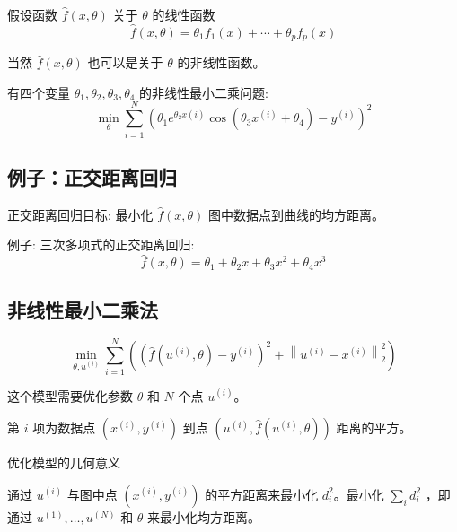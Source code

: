 假设函数 $ \hat{f}(x, \theta) $ 关于 $ \theta $ 的线性函数
$$
\hat{f}(x, \theta)=\theta_{1} f_{1}(x)+\cdots+\theta_{p} f_{p}(x)
$$

当然 $ \hat{f}(x, \theta) $ 也可以是关于 $ \theta $ 的非线性函数。

\begin{example}
    有四个变量 $ \theta_{1}, \theta_{2}, \theta_{3}, \theta_{4} $ 的非线性最小二乘问题:
$$
\min _{\theta} \sum_{i=1}^{N}\left(\theta_{1} e^{\theta_{2} x(i)} \cos \left(\theta_{3} x^{(i)}+\theta_{4}\right)-y^{(i)}\right)^{2}
$$

\end{example}

\subsection{例子：正交距离回归}

正交距离回归目标: 最小化 $ \hat{f}(x, \theta) $ 图中数据点到曲线的均方距离。 

例子: 三次多项式的正交距离回归:
$$
\hat{f}(x, \theta)=\theta_{1}+\theta_{2} x+\theta_{3} x^{2}+\theta_{4} x^{3}
$$


\subsection{非线性最小二乘法}

\begin{problem}
    $$
\min _{\theta, u^{(i)}} \sum_{i=1}^{N}\left(\left(\hat{f}\left(u^{(i)}, \theta\right)-y^{(i)}\right)^{2}+\left\|u^{(i)}-x^{(i)}\right\|_{2}^{2}\right)
$$

这个模型需要优化参数 $ \theta $ 和 $ {N} $ 个点 $ u^{(i)} $。
\end{problem}

第 $ i $ 项为数据点 $ \left(x^{(i)}, y^{(i)}\right) $ 到点 $ \left(u^{(i)}, \hat{f}\left(u^{(i)}, \theta\right)\right) $ 距离的平方。

\begin{FigureCenter}{优化模型的几何意义}
    
\end{FigureCenter}

通过 $ u^{(i)} $ 与图中点 $ \left(x^{(i)}, y^{(i)}\right) $ 的平方距离来最小化 $ d_{i}^{2} $。最小化 $ \sum_{i} d_{i}^{2} $ ，即通过 $ u^{(1)}, \ldots, u^{(N)} $ 和 $ \theta $ 来最小化均方距离。

